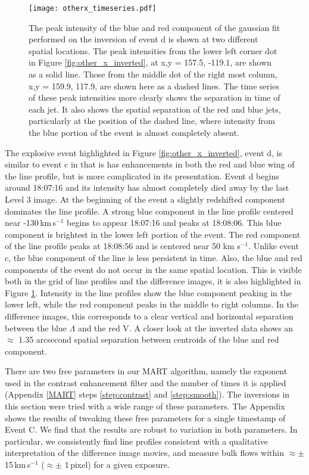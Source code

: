 			\begin{figure}
				\texttt{[image: otherx\_timeseries.pdf]}
				\caption{The peak intensity of the blue and red component of the gaussian fit performed on the inversion of event d is shown at two different spatial locations.
				The peak intensities from the lower left corner dot in Figure \ref{fig:other_x_inverted}, at x,y = 157.5\arcsec, -119.1\arcsec, are shown as a solid line.
				Those from the middle dot of the right most column, x,y = 159.9\arcsec, 117.9\arcsec, are shown here as a dashed lines.
				The time series of these peak intensities more clearly shows the separation in time of each jet.
				It also shows the spatial separation of the red and blue jets, particularly at the position of the dashed line, where intensity from the blue portion of the event is almost completely absent.
				}
				\label{fig:otherx_timeseries}
			\end{figure}
		
		The explosive event highlighted in Figure \ref{fig:other_x_inverted}, event d, is similar to event c in that is has enhancements in both the red and blue wing of the line profile, but is more complicated in its presentation.
		Event d  begins around 18:07:16 and its intensity has almost completely died away by the last Level 3 image.
		At the beginning of the event a slightly redshifted component dominates the line profile.
		A strong blue component in the line profile centered near -130\,km\,s$^{-1}$ begins to appear 18:07:16 and peaks at 18:08:06. 
		This blue component is brightest in the lower left portion of the event.
		The red component of the line profile peaks at 18:08:56 and is centered near 50 km s$^{-1}$.
		Unlike event c, the blue component of the line is less persistent in time.
		Also, the blue and red components of the event do not occur in the same spatial location.
		This is visible both in the grid of line profiles and the difference images, it is also highlighted in Figure \ref{fig:otherx_timeseries}.
		Intensity in the line profiles show the blue component peaking in the lower left, while the red component peaks in the middle to right columns.
		In the difference images, this corresponds to a clear vertical and horizontal separation between the blue $\Lambda$ and the red V. 
		A closer look at the inverted data shows an $\approx$ 1.35 arcsecond spatial separation between centroids of the blue and red component.
	    		   	
        There are two free parameters in our MART algorithm, namely the exponent used in the contrast enhancement filter and the number of times it is applied (Appendix \ref{MART} steps \ref{step:contrast} and \ref{step:smooth}). The inversions in this section were tried with a wide range of these parameters. 
        The Appendix shows the results of tweaking these free parameters for a single timestamp of Event C.
        We find that the results are robust to variation in both parameters. 
        In particular, we consistently find line profiles consistent with a qualitative interpretation of the difference image movies, and measure bulk flows within $\approx\pm$ 15\,km\,s$^{-1}$ ($\approx\pm$ 1\,pixel) for a given exposure. 
    
